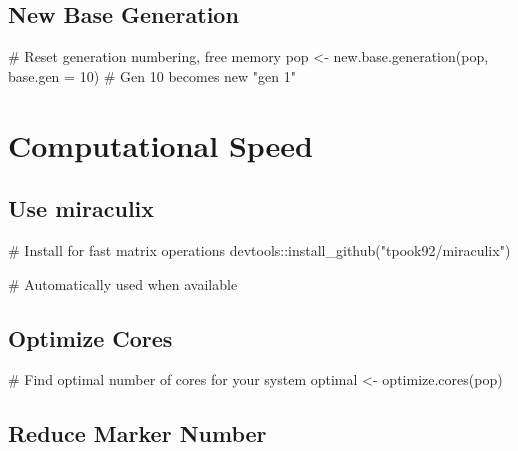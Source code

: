 \documentclass[
  letterpaper,
]{book}
\newenvironment{Shaded}{\begin{snugshade}}{\end{snugshade}}
\newcommand{\AttributeTok}[1]{\textcolor[rgb]{0.40,0.45,0.13}{#1}}
\newcommand{\CommentTok}[1]{\textcolor[rgb]{0.37,0.37,0.37}{#1}}
\newcommand{\DecValTok}[1]{\textcolor[rgb]{0.68,0.00,0.00}{#1}}
\newcommand{\FunctionTok}[1]{\textcolor[rgb]{0.28,0.35,0.67}{#1}}
\newcommand{\NormalTok}[1]{\textcolor[rgb]{0.00,0.23,0.31}{#1}}
\newcommand{\OtherTok}[1]{\textcolor[rgb]{0.00,0.23,0.31}{#1}}
\newcommand{\SpecialCharTok}[1]{\textcolor[rgb]{0.37,0.37,0.37}{#1}}
\newcommand{\StringTok}[1]{\textcolor[rgb]{0.13,0.47,0.30}{#1}}
\begin{document}
\subsection{New Base Generation}\label{new-base-generation}

\begin{Shaded}
\begin{Highlighting}[]
\CommentTok{\# Reset generation numbering, free memory}
\NormalTok{pop }\OtherTok{\textless{}{-}} \FunctionTok{new.base.generation}\NormalTok{(pop, }\AttributeTok{base.gen =} \DecValTok{10}\NormalTok{)}
\CommentTok{\# Gen 10 becomes new "gen 1"}
\end{Highlighting}
\end{Shaded}

\section{Computational Speed}\label{computational-speed}

\subsection{Use miraculix}\label{use-miraculix}

\begin{Shaded}
\begin{Highlighting}[]
\CommentTok{\# Install for fast matrix operations}
\NormalTok{devtools}\SpecialCharTok{::}\FunctionTok{install\_github}\NormalTok{(}\StringTok{"tpook92/miraculix"}\NormalTok{)}

\CommentTok{\# Automatically used when available}
\end{Highlighting}
\end{Shaded}

\subsection{Optimize Cores}\label{optimize-cores}

\begin{Shaded}
\begin{Highlighting}[]
\CommentTok{\# Find optimal number of cores for your system}
\NormalTok{optimal }\OtherTok{\textless{}{-}} \FunctionTok{optimize.cores}\NormalTok{(pop)}
\end{Highlighting}
\end{Shaded}

\subsection{Reduce Marker Number}\label{reduce-marker-number}
\end{document}
